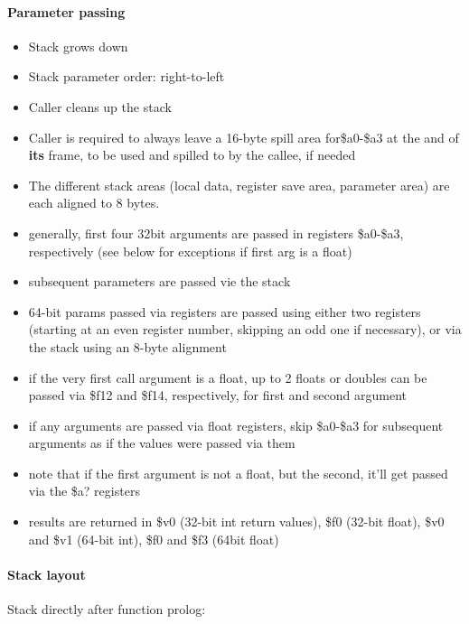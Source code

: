 \paragraph{Parameter passing}

\begin{itemize}
\item Stack grows down
\item Stack parameter order: right-to-left
\item Caller cleans up the stack
\item Caller is required to always leave a 16-byte spill area for\$a0-\$a3 at the and of {\bf its} frame, to be used and spilled to by the callee, if needed
\item The different stack areas (local data, register save area, parameter area) are each aligned to 8 bytes.
\item generally, first four 32bit arguments are passed in registers \$a0-\$a3, respectively (see below for exceptions if first arg is a float)
\item subsequent parameters are passed vie the stack
\item 64-bit params passed via registers are passed using either two registers (starting at an even register number, skipping an odd one if necessary), or via the stack using an 8-byte alignment
\item if the very first call argument is a float, up to 2 floats or doubles can be passed via \$f12 and \$f14, respectively, for first and second argument
\item if any arguments are passed via float registers, skip \$a0-\$a3 for subsequent arguments as if the values were passed via them
\item note that if the first argument is not a float, but the second, it'll get passed via the \$a? registers
\item results are returned in \$v0 (32-bit int return values), \$f0 (32-bit float), \$v0 and \$v1 (64-bit int), \$f0 and \$f3 (64bit float)
\end{itemize}

\paragraph{Stack layout}

Stack directly after function prolog:\\

